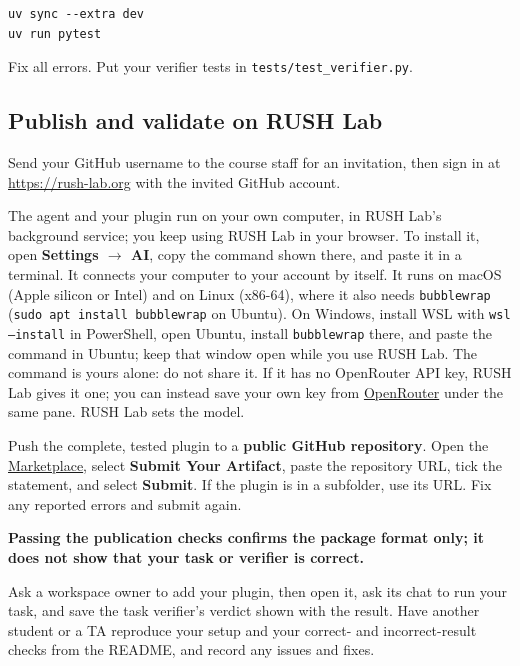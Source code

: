 \documentclass{article}
\begin{document}
\begin{lstlisting}
uv sync --extra dev
uv run pytest
\end{lstlisting}

\noindent
Fix all errors. Put your verifier tests in \texttt{tests/test\_verifier.py}.

\subsection{Publish and validate on RUSH Lab}

Send your GitHub username to the course staff for an invitation, then sign in
at \url{https://rush-lab.org} with the invited GitHub account.

\medskip
\noindent
The agent and your plugin run on your own computer, in RUSH Lab's background
service; you keep using RUSH Lab in your browser. To install it, open
\textbf{Settings $\rightarrow$ AI}, copy the command shown there, and paste it
in a terminal. It connects your computer to your account by itself. It runs on
macOS (Apple silicon or Intel) and on Linux (x86-64), where it also needs
\texttt{bubblewrap} (\texttt{sudo apt install bubblewrap} on Ubuntu). On
Windows, install WSL with \texttt{wsl --install} in PowerShell, open Ubuntu,
install \texttt{bubblewrap} there, and paste the command in Ubuntu; keep that
window open while you use RUSH Lab. The command is yours alone: do not share it.
If it has no OpenRouter API key, RUSH Lab gives it one;
you can instead save your own key from
\href{https://openrouter.ai/settings/keys}{OpenRouter} under the same pane.
RUSH Lab sets the model.

\medskip
\noindent
Push the complete, tested plugin to a \textbf{public GitHub repository}. Open
the \href{https://rush-lab.org/w/comp-480-580/marketplace}{Marketplace},
select \textbf{Submit Your Artifact}, paste the repository URL, tick the
statement, and select \textbf{Submit}. If the plugin is in a subfolder, use
its  URL. Fix any reported errors and submit
again.

\medskip
\noindent
\textbf{Passing the publication checks confirms the package format only; it
does not show that your task or verifier is correct.}

\medskip
\noindent
Ask a workspace owner to add your plugin, then open it, ask its chat to run
your task, and save the task verifier's verdict shown with the result. Have
another student or a TA reproduce your setup and your correct- and
incorrect-result checks from the README, and record any issues and fixes.
\end{document}
